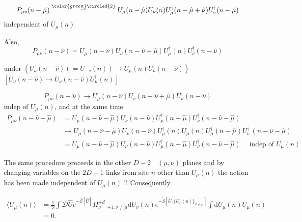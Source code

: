 \begin{itemize}
\begin{itemize}
\begin{equation}
P_{\mu v}(n-\hat{\mu})\stackrel{{\tiny{\color{green} \circled{2}}}}{=} U_{\mu}(n-\hat{\mu}) U_{\nu}(n) U_{\mu}^{\dagger}(n-\hat{\mu}+\hat{\nu}) U_{v}^{\dagger}(n-\hat{\mu})
\end{equation}
independent of \(U_{\mu}(n)\)

Also,
\begin{equation}
P_{\mu\nu}(n-\hat{\nu})=U_{\mu}(n-\hat{\nu}) U_{\nu}(n-\hat{\nu}+\hat{\mu}) U_{\mu}^{\dagger}(n) U_{\nu}^{\dagger}(n-\hat{\nu})
\end{equation}

under \(\left(U_{\nu}^{\dagger}(n-\hat{\nu})\left(=U_{-\nu}(n)\right) \rightarrow U_{\mu}(n) U_{\nu}^{\dagger}(n-\hat{\nu})\right)\) \color{green}  \color{black} \(\left[U_{\nu}(n-\hat{\nu}) \rightarrow U_{\nu}(n-\hat{\nu}) U_{\mu}^{\dagger}(n)\right]\)

\begin{equation}
P_{\mu \nu}(n-\hat{\nu}) \rightarrow U_{\mu}(n-\hat{\nu}) U_{\nu}(n-\hat{\nu}+\hat{\mu}) U_{\nu}^{\dagger}(n-\hat{\nu}) 
\end{equation}
indep of $U_{\mu}(n)$, and at the same time
\begin{equation}
\begin{aligned}
 P_{\mu \nu}(n-\hat{\nu}-\hat{\mu})&=U_{\mu}(n-\hat{\nu}-\hat{\mu}) U_{\nu}(n-\hat{\nu}) U_{\mu}^{\dagger}(n-\hat{\mu}) U_{\nu}^{\dagger}(n-\hat{\nu}-\hat{\mu}) \\
& \rightarrow U_{\mu}(n-\hat{\nu}-\hat{\mu}) U_{\nu}(n-\hat{\nu}) U_{\mu}^{\dagger}(n) U_{\mu}(n) U_{\mu}^{\dagger}(n-\hat{\mu}) U_{\nu}^{+}(n-\hat{\nu}-\hat{\mu}) \\
& =U_{\mu}(n-\hat{\nu}-\hat{\mu}) U_{\nu}(n-\hat{\nu}) U_{\mu}^{\dagger}(n-\hat{\mu}) U_{\nu}^{\dagger}(n-\hat{\nu}-\hat{\mu}) \quad \text { indep of } U_{\mu}(n)
\end{aligned}
\end{equation}

The same procedure proceeds in the other \(D-2\quad(\mu, \nu)\) planes and by changing variables on the \(2D-1\) links from site \(n\) other than \(U_{\mu}(n)\) the action has been made independent of \(U_{\mu}(n)\) !! Consequently

\begin{align}
    \langle U_\mu(n)\rangle &= \frac{1}{Z}\int \mathcal{D} \hat{U} e^{- \hat{S}[\hat{U}]} \Pi_{\nu = \pm 1, \nu \neq \mu}^{\pm d} \text{d} U_\nu (n) e^{-\tilde{S}[\hat{U}, \{U_\nu(n)\}_{\nu \neq \mu}]} \int \text{d}U_\mu(n) U_\mu(n) \nonumber \\
    &= 0.
\end{align}
  \end{itemize}



\end{itemize}
